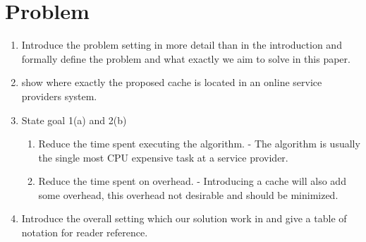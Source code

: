 \section{Problem}\label{sec:problemdef}
\begin{enumerate}
\item Introduce the problem setting in more detail than in the introduction and formally define the problem and what exactly we aim to solve in this paper.\\
\item show where exactly the proposed cache is located in an online \spath service providers system.
\item State goal 1(a) and 2(b)
	\begin{enumerate}
	\item Reduce the time spent executing the \spath algorithm. - The \spath algorithm is usually the single most CPU expensive task at a \spath service provider.
	\item Reduce the time spent on overhead. - Introducing a cache will also add some overhead, this overhead not desirable and should  be minimized.
	\end{enumerate}
\item Introduce the overall setting which our solution work in and give a table of notation for reader reference.
\end{enumerate}